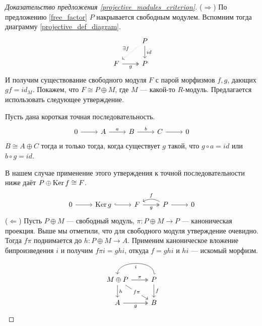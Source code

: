 \documentclass[../main.tex]{subfiles}
\begin{document}
\begin{proof}[Доказательство предложения \ref{projective_modules_criterion}]
    ($\Rightarrow$) По предложению \ref{free_factor} $P$ накрывается свободным модулем. Вспомним тогда диаграмму \eqref{projective_def_diagram}.
    \begin{equation*}
        \begin{tikzcd}
	& P \\
	F & P
	\arrow["g"', two heads, from=2-1, to=2-2]
	\arrow["id", from=1-2, to=2-2]
	\arrow["{\exists f}"', dotted, from=1-2, to=2-1]
\end{tikzcd}
    \end{equation*}
    И получим существование свободного модуля $F$ с парой морфизмов $f, g$, дающих $gf=id_M$. Покажем, что $F\cong P\oplus M$, где $M$ --- какой-то $R$-модуль. Предлагается использовать следующее утверждение.
    \begin{to_suj}
    Пусть дана короткая точная последовательность.
    \begin{equation*}
        \begin{tikzcd}
	0 & A & B & C & 0
	\arrow[from=1-1, to=1-2]
	\arrow["a", from=1-2, to=1-3]
	\arrow["b", from=1-3, to=1-4]
	\arrow[from=1-4, to=1-5]
\end{tikzcd}
    \end{equation*}
    $B\cong A\oplus C$ тогда и только тогда, когда существует $g$ такой, что $g\circ a = id$ или $b\circ g = id$.
    \end{to_suj}
    В нашем случае применение этого утверждения к точной последовательности ниже даёт $P\oplus \mathop{\mathrm{Ker}}\nolimits f \cong F$.
    \begin{equation*}
        \begin{tikzcd}
	0 & {\Ker g} & F & P & 0
	\arrow[from=1-1, to=1-2]
	\arrow[hook, from=1-2, to=1-3]
	\arrow["g"', two heads, from=1-3, to=1-4]
	\arrow[from=1-4, to=1-5]
	\arrow["f"', bend right, from=1-4, to=1-3]
\end{tikzcd}
    \end{equation*}
($\Leftarrow$) Пусть $P\oplus M$ --- свободный модуль, $\pi: P\oplus M \to P$ --- каноническая проекция. Выше мы отметили, что для свободного модуля утверждение очевидно. Тогда $f\pi$ поднимается до $h:P\oplus M \to A$. Применим каноническое вложение бипроизведения $i$ и получим $f\pi i = ghi$, откуда $f = ghi$ и $hi$ --- искомый морфизм.
    \begin{equation*}
        \begin{tikzcd}
	{M\oplus P} & P \\
	A & B
	\arrow["g"', two heads, from=2-1, to=2-2]
	\arrow["f", from=1-2, to=2-2]
	\arrow["\pi", two heads, from=1-1, to=1-2]
	\arrow["i", bend right=90, hook', from=1-2, to=1-1]
	\arrow["h", from=1-1, to=2-1]
	\arrow["f\pi"{description}, from=1-1, to=2-2]
\end{tikzcd}
    \end{equation*}
\end{proof}
\end{document}
